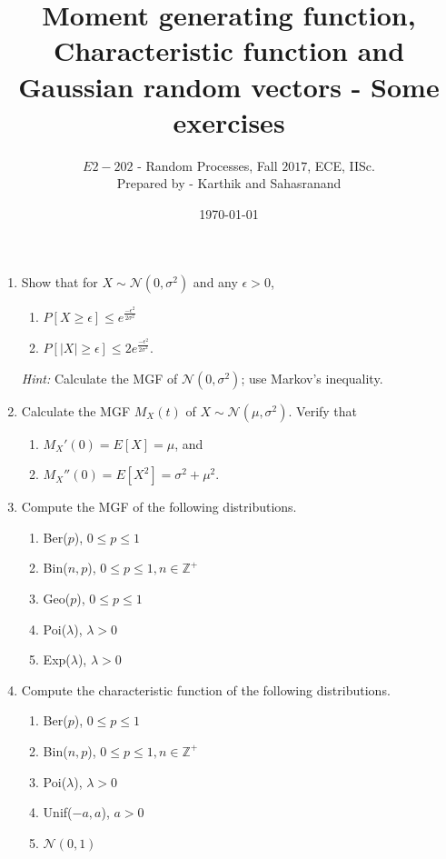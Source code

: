 \documentclass[11pt]{article}
\title {\sc Moment generating function, Characteristic function and Gaussian random vectors - Some exercises}
\author{$E2-202$ - Random Processes, Fall $2017$, ECE, IISc.\\Prepared by - Karthik and Sahasranand}
\date{\today}
\begin{document}
\maketitle 

\begin{enumerate}
\item Show that for $X \sim \mathcal{N}(0,\sigma^2)$ and any $\epsilon >0$, 
\begin{enumerate}
\item $P[X \ge \epsilon] \le e^{\frac{-\epsilon^2}{2\sigma^2}}$
\item $P[|X| \ge \epsilon] \le 2e^{\frac{-\epsilon^2}{2\sigma^2}}$.
\end{enumerate}
\emph{Hint:} Calculate the MGF of $\mathcal{N}(0,\sigma^2)$; use Markov's inequality.

\item Calculate the MGF $M_X(t)$ of $X \sim \mathcal{N}(\mu, \sigma^2)$. Verify that
\begin{enumerate}
\item $M_X'(0) = E[X] = \mu$, and
\item $M_X''(0) = E[X^2] = \sigma^2 + \mu^2$.
\end{enumerate}

\item Compute the MGF of the following distributions.
\begin{enumerate}
\item Ber($p$), $0 \le p \le 1$
\item Bin($n,p$), $0 \le p \le 1, n \in \mathbb{Z}^+$
\item Geo($p$), $0 \le p \le 1$
\item Poi($\lambda$), $\lambda > 0$
\item Exp($\lambda$), $\lambda > 0$
\end{enumerate}

\item Compute the characteristic function of the following distributions.
\begin{enumerate}
\item Ber($p$), $0 \le p \le 1$
\item Bin($n,p$), $0 \le p \le 1, n \in \mathbb{Z}^+$
\item Poi($\lambda$), $\lambda > 0$
\item Unif($-a,a$), $a > 0$
\item $\mathcal{N}(0,1)$
\end{enumerate}


\end{enumerate}
\end{document}
